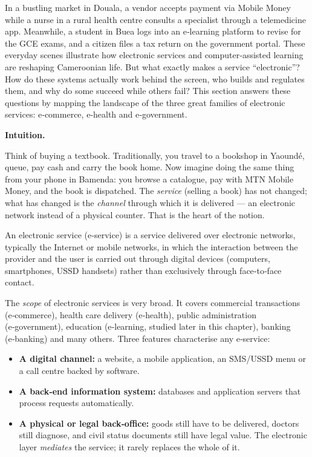 \documentclass[11pt]{article}
\newcommand{\cle}[1]{{\popxbold\color{popdark}#1}}
\newcounter{popsec}
\newcounter{popsub}
\newcommand{\courssub}[1]{%
  \stepcounter{popsub}%
  \par\vspace{9pt}\noindent{\popxbold\fontsize{11.5}{13}\selectfont\color{popink}{\color{poporange}\thepopsec.\thepopsub}\hspace{6pt}#1}\par\nopagebreak\vspace{4pt}
}
\begin{document}
In a bustling market in Douala, a vendor accepts payment via Mobile Money while a nurse in a rural health centre consults a specialist through a telemedicine app. Meanwhile, a student in Buea logs into an e‑learning platform to revise for the GCE exams, and a citizen files a tax return on the government portal. These everyday scenes illustrate how electronic services and computer‑assisted learning are reshaping Cameroonian life. But what exactly makes a service ``electronic''? How do these systems actually work behind the screen, who builds and regulates them, and why do some succeed while others fail? This section answers these questions by mapping the landscape of the three great families of electronic services: \cle{e‑commerce}, \cle{e‑health} and \cle{e‑government}.

\courssub{What is an Electronic Service?}

\textbf{Intuition.}\par
Think of buying a textbook. Traditionally, you travel to a bookshop in Yaoundé, queue, pay cash and carry the book home. Now imagine doing the same thing from your phone in Bamenda: you browse a catalogue, pay with MTN Mobile Money, and the book is dispatched. The \emph{service} (selling a book) has not changed; what has changed is the \emph{channel} through which it is delivered — an electronic network instead of a physical counter. That is the heart of the notion.

\begin{definition}
An \cle{electronic service} (e‑service) is a service delivered over electronic networks, typically the Internet or mobile networks, in which the interaction between the provider and the user is carried out through digital devices (computers, smartphones, USSD handsets) rather than exclusively through face‑to‑face contact.
\end{definition}

The \emph{scope} of electronic services is very broad. It covers commercial transactions (e‑commerce), health care delivery (e‑health), public administration (e‑government), education (e‑learning, studied later in this chapter), banking (e‑banking) and many others. Three features characterise any e‑service:

\begin{itemize}
\item \textbf{A digital channel:} a website, a mobile application, an SMS/USSD menu or a call centre backed by software.
\item \textbf{A back‑end information system:} databases and application servers that process requests automatically.
\item \textbf{A physical or legal back‑office:} goods still have to be delivered, doctors still diagnose, and civil status documents still have legal value. The electronic layer \emph{mediates} the service; it rarely replaces the whole of it.
\end{itemize}
\end{document}
